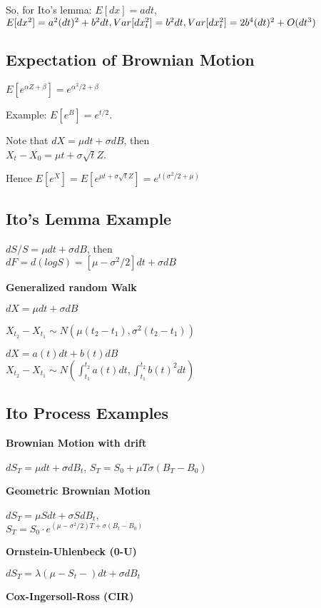 So, for Ito's lemma: $E[dx] = a dt$, $E[dx^2] = a^2 (dt)^2 + b^2 dt, Var[dx_t^2] = b^2 dt, \\ Var[dx_t^2] = 2b^4(dt)^2 + O(dt^3)$

\subsection{Expectation of Brownian Motion}

$E[e^{\alpha Z + \beta}] = e^{\alpha^2/2 + \beta}$

Example: $E[e^B] = e^{t/2}$. 

Note that $dX = \mu dt + \sigma dB$, then \\$X_t - X_0 = \mu t + \sigma \sqrt{t}Z$. 

Hence $E[e^{X}] = E[e^{\mu t + \sigma \sqrt{t} Z}] = e^{t (\sigma^2/2 + \mu)}$

\subsection{Ito's Lemma Example}

$dS/S = \mu dt + \sigma dB$, then \\ $dF = d(log S) = [\mu - \sigma^2/2]dt + \sigma dB$


\textbf{Generalized random Walk}

$dX = \mu dt + \sigma dB$

$X_{t_2} - X_{t_1} \sim N (\mu (t_2 - t_1), \sigma^2 (t_2 - t_1))$

$dX = a(t)dt + b(t)dB$ \\ $X_{t_2}- X_{t_1} \sim N(\int_{t_1}^{t_2}a(t)dt, \int_{t_1}^{t_2}b(t)^2 dt)$

\subsection{Ito Process Examples}

\textbf{Brownian Motion with drift}

$dS_T = \mu dt + \sigma dB_t$, $S_T = S_0 + \mu T \sigma (B_T - B_0)$

\textbf{Geometric Brownian Motion}

$dS_T = \mu S dt + \sigma S dB_t$, \\ $S_T = S_0 \cdot e^{(\mu - \sigma^2/2)T + \sigma(B_t - B_0)}$

\textbf{Ornstein-Uhlenbeck (0-U)}

$dS_T = \lambda(\mu - S_t - )dt + \sigma dB_t $

\textbf{Cox-Ingersoll-Ross (CIR)}

